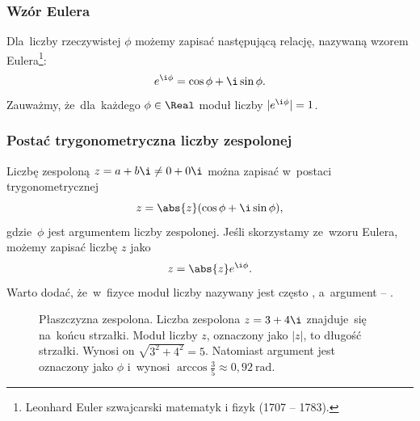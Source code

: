 \subsubsection{Wzór Eulera}
Dla~liczby rzeczywistej $\phi$ możemy zapisać następującą relację, nazywaną wzorem Eulera\footnote{
	Leonhard Euler szwajcarski matematyk i fizyk (1707 -- 1783).}:
$$
	e^{\i \phi} = \cos\phi + \i \sin\phi.
$$
Zauważmy, że~dla~każdego $\phi\in \Real$ moduł liczby $|e^{\i \phi}| = 1$.

\subsubsection{Postać trygonometryczna liczby zespolonej}
Liczbę zespoloną $z = a + b\i \neq 0 + 0\i$ można zapisać w~postaci trygonometrycznej
$$
	z = \abs{z}(\cos \phi + \i \sin \phi),
$$
gdzie~$\phi$ jest argumentem liczby zespolonej.
Jeśli skorzystamy ze~wzoru Eulera, możemy zapisać liczbę $z$ jako
$$
	z = \abs{z}e^{\i \phi}.
$$
Warto dodać, że~w~fizyce moduł liczby nazywany jest często ,
a~argument -- .

\begin{figure}[h]
	\centering
	\caption{Płaszczyzna zespolona. Liczba zespolona $z=3+4\i$
		znajduje~się na~końcu strzałki. Moduł liczby $z$, oznaczony jako $|z|$,
		to długość strzałki. Wynosi on $\sqrt{3^2+4^2}=5$. Natomiast
		argument jest oznaczony jako $\phi$ i~wynosi $\arccos{\frac{3}{5}}\approx 0{,}92\ \mathrm{rad}.$}
	\label{rys:postaćgeometryczna}
\end{figure}

